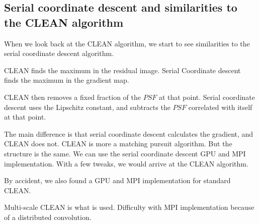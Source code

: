 \subsection{Serial coordinate descent and similarities to the CLEAN algorithm}
When we look back at the CLEAN algorithm, we start to see similarities to the serial coordinate descent algorithm. 

CLEAN finds the maximum in the residual image. Serial Coordinate descent finds the maximum in the gradient map.

CLEAN then removes a fixed fraction of the $PSF$ at that point. Serial coordinate descent uses the Lipschitz constant, and subtracts the $PSF$ correlated with itself at that point.

The main difference is that serial coordinate descent calculates the gradient, and CLEAN does not. CLEAN is more a matching pursuit algorithm. But the structure is the same. We can use the serial coordinate descent GPU and MPI implementation. With a few tweaks, we would arrive at the CLEAN algorithm.

By accident, we also found a GPU and MPI implementation for standard CLEAN.

Multi-scale CLEAN is what is used. Difficulty with MPI implementation because of a distributed convolution.

